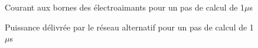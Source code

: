 \begin{figure}[htb]
\centering
{}
\caption{Courant aux bornes des électroaimants pour un pas de calcul de 1$\mu$s}
\label{AF_DC_CHA1}
\end{figure}

\begin{figure}[htb]
\centering
{}
\caption{Puissance délivrée par le réseau alternatif pour un pas de calcul de 1$\mu$s}
\label{AF_DC_CHA2}
\end{figure}


